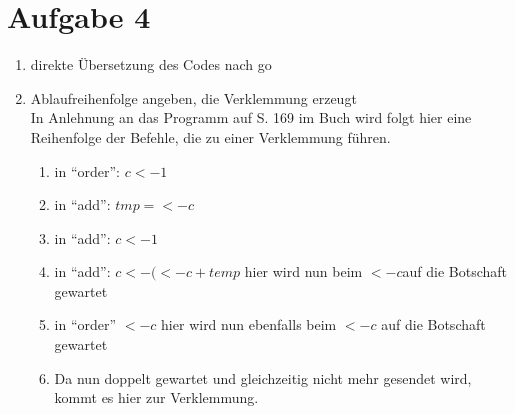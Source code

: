 \documentclass[11pt,a4paper,DIV=10,]{scrartcl}
\begin{document}
\section*{Aufgabe 4}
\begin{enumerate}
 \item direkte Übersetzung des Codes nach go 
 
 
 \item Ablaufreihenfolge angeben, die Verklemmung erzeugt \\
 In Anlehnung an das Programm auf S. 169 im Buch wird folgt hier eine Reihenfolge der Befehle, die zu einer Verklemmung führen. 
\begin{enumerate}
  \item in ``order'': $c<-1$
  \item in ``add'': $tmp=<-c$
  \item in ``add'': $c<-1$
  \item in ``add'': $c<- (<-c+temp$ hier wird nun beim $ <-c $auf die Botschaft gewartet
  \item in ``order'' $<-c$ hier wird nun ebenfalls beim $<-c$ auf die Botschaft gewartet
  \item Da nun doppelt gewartet und gleichzeitig nicht mehr gesendet wird, kommt es hier zur Verklemmung. 
\end{enumerate}

 
\end{enumerate}
\end{document}
